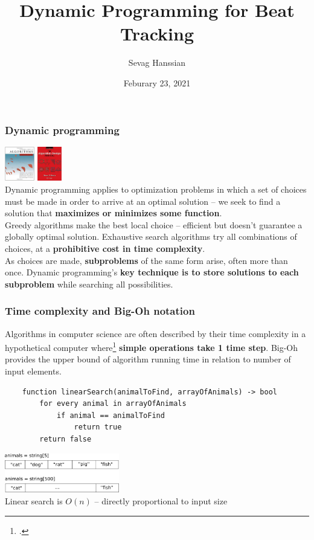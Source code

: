 \documentclass{beamer}
\title{Dynamic Programming for Beat Tracking}
\author{Sevag Hanssian}
\date{Feburary 23, 2021}
\institute{MUMT 621, Winter 2021}
\begin{document}
\begin{frame}
\maketitle
\end{frame}

\begin{frame}
	\frametitle{Dynamic programming}
	\vspace{0.5em}
	\includegraphics[height=1.5cm]{./clrs.jpg} \includegraphics[height=1.5cm]{./skiena.jpg}\\
	Dynamic programming applies to optimization problems in which a set of choices must be made in order to arrive at an optimal solution -- we seek to find a solution that \textbf{maximizes or minimizes some function}.\\
	\vspace{1em}
	Greedy algorithms make the best local choice -- efficient but doesn't guarantee a globally optimal solution. Exhaustive search algorithms try all combinations of choices, at a \textbf{prohibitive cost in time complexity}.\\
	\vspace{1em}
	As choices are made, \textbf{subproblems} of the same form arise, often more than once. Dynamic programming's \textbf{key technique is to store solutions to each subproblem} while searching all possibilities.
\end{frame}

\begin{frame}[fragile]
	\frametitle{Time complexity and Big-Oh notation}
	Algorithms in computer science are often described by their time complexity in a hypothetical computer where\footcite{skiena} \textbf{simple operations take 1 time step}. Big-Oh provides the upper bound of algorithm running time in relation to number of input elements.
	\begin{verbatim}
	function linearSearch(animalToFind, arrayOfAnimals) -> bool
	    for every animal in arrayOfAnimals
	        if animal == animalToFind
	            return true
	    return false
	\end{verbatim}
	\includegraphics[width=5cm]{./linearsearch.png}\\
	Linear search is $O(n)$ -- directly proportional to input size
\end{frame}
\end{document}
